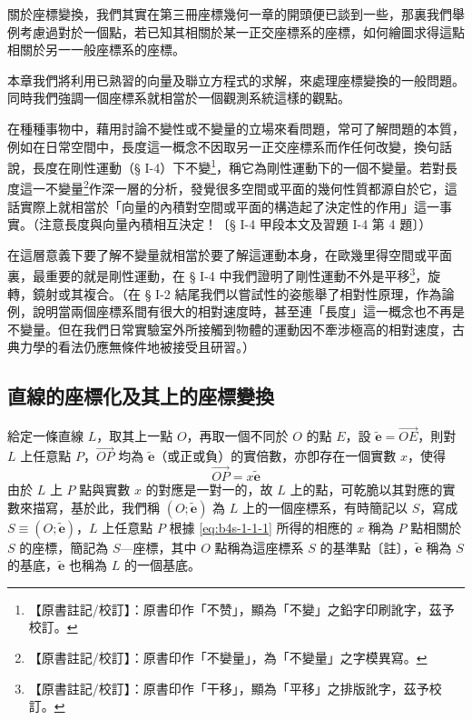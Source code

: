 關於座標變換，我們其實在第三冊座標幾何一章的開頭便已談到一些，那裏我們舉例考慮過對於一個點，若已知其相關於某一正交座標系的座標，如何繪圖求得這點相關於另一一般座標系的座標。

本章我們將利用已熟習的向量及聯立方程式的求解，來處理座標變換的一般問題。同時我們強調一個座標系就相當於一個觀測系統這樣的觀點。

在種種事物中，藉用討論不變性或不變量的立場來看問題，常可了解問題的本質，例如在日常空間中，長度這一概念不因取另一正交座標系而作任何改變，換句話說，長度在剛性運動（§ I-4）下不變\label{note:b4s-ch1-p2-bubiang}\footnote{【原書註記/校訂】：原書印作「不赞」，顯為「不變」之鉛字印刷訛字，茲予校訂。}，稱它為剛性運動下的一個不變量。若對長度這一不變量\label{note:b4s-ch1-p2-bubiangliang}\footnote{【原書註記/校訂】：原書印作「不孌量」，為「不變量」之字模異寫。}作深一層的分析，發覺很多空間或平面的幾何性質都源自於它，這話實際上就相當於「向量的內積對空間或平面的構造起了決定性的作用」這一事實。（注意長度與向量內積相互決定！〔§ I-4 甲段本文及習題 I-4 第 4 題〕）

在這層意義下要了解不變量就相當於要了解這運動本身，在歐幾里得空間或平面裏，最重要的就是剛性運動，在 § I-4 中我們證明了剛性運動不外是平移\label{note:b4s-ch1-p2-pingyi}\footnote{【原書註記/校訂】：原書印作「干移」，顯為「平移」之排版訛字，茲予校訂。}，旋轉，鏡射或其複合。（在 § I-2 結尾我們以嘗試性的姿態舉了相對性原理，作為論例，說明當兩個座標系間有很大的相對速度時，甚至連「長度」這一概念也不再是不變量。但在我們日常實驗室外所接觸到物體的運動因不牽涉極高的相對速度，古典力學的看法仍應無條件地被接受且研習。）

\subsection{直線的座標化及其上的座標變換}
\label{sec:b4s-1-1}

給定一條直線 $L$，取其上一點 $O$，再取一個不同於 $O$ 的點 $E$，設 $\tilde{\mathbf{e}} = \vec{OE}$，則對 $L$ 上任意點 $P$，$\vec{OP}$ 均為 $\tilde{\mathbf{e}}$（或正或負）的實倍數，亦卽存在一個實數 $x$，使得
\begin{equation}
\vec{OP} = x \tilde{\mathbf{e}} \label{eq:b4s-1-1-1}
\end{equation}
由於 $L$ 上 $P$ 點與實數 $x$ 的對應是一對一的，故 $L$ 上的點，可乾脆以其對應的實數來描寫，基於此，我們稱 $(O; \tilde{\mathbf{e}})$ 為 $L$ 上的一個座標系，有時簡記以 $S$，寫成 $S \equiv (O; \tilde{\mathbf{e}})$，$L$ 上任意點 $P$ 根據 \eqref{eq:b4s-1-1-1} 所得的相應的 $x$ 稱為 $P$ 點相關於 $S$ 的座標，簡記為 $S$---座標，其中 $O$ 點稱為這座標系 $S$ 的基準點〔註〕，$\tilde{\mathbf{e}}$ 稱為 $S$ 的基底，$\tilde{\mathbf{e}}$ 也稱為 $L$ 的一個基底。

